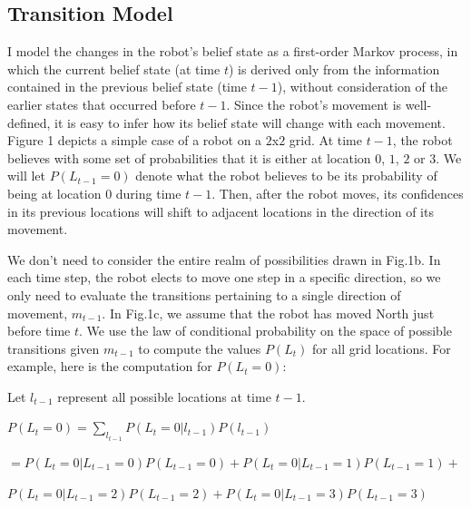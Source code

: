 \documentclass{article}
\begin{document}
\subsection{Transition Model}

I model the changes in the robot's belief state as a first-order Markov process, in which the current belief state (at time $t$) is derived only from the information contained in the previous belief state (time $t-1$), without consideration of the earlier states that occurred before $t-1$. Since the robot's movement is well-defined, it is easy to infer how its belief state will change with each movement. Figure 1 depicts a simple case of a robot on a $2$x$2$ grid. At time $t-1$, the robot believes with some set of probabilities that it is either at location $0$, $1$, $2$ or $3$. We will let $P(L_{t-1} = 0)$ denote what the robot believes to be its probability of being at location $0$ during time $t-1$. Then, after the robot moves, its confidences in its previous locations will shift to adjacent locations in the direction of its movement.

\vspace{2mm}

We don't need to consider the entire realm of possibilities drawn in Fig.1b. In each time step, the robot elects to move one step in a specific direction, so we only need to evaluate the transitions pertaining to a single direction of movement, $m_{t-1}$. In Fig.1c, we assume that the robot has moved North just before time $t$. We use the law of conditional probability on the space of possible transitions given $m_{t-1}$ to compute the values $P(L_t)$ for all grid locations. For example, here is the computation for $P(L_t = 0)$:

\vspace{5mm}

Let $l_{t-1}$ represent all possible locations at time $t-1$.

\vspace{5mm}

$P(L_t=0) = \sum_{l_{t-1}}P(L_t=0 | l_{t-1})P(l_{t-1})$

\vspace{4mm}\hspace{17mm}$ = P(L_t=0 | L_{t-1}=0)P(L_{t-1} = 0) + P(L_t=0 | L_{t-1}=1)P(L_{t-1} = 1)  + $

\vspace{2mm}\hspace{22mm}$ P(L_t=0 | L_{t-1}=2)P(L_{t-1} = 2) + P(L_t=0 | L_{t-1}=3)P(L_{t-1} = 3) $
\end{document}
